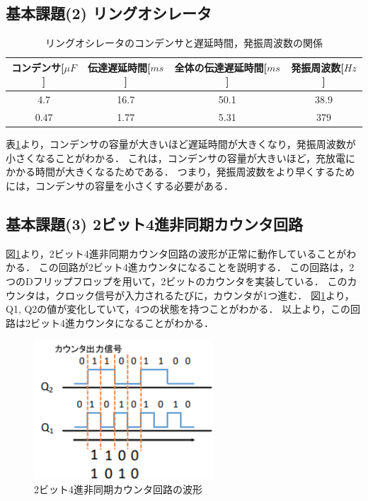 \documentclass{ltjsarticle}
\begin{document}
\subsection{基本課題(2) リングオシレータ}
\begin{table}[H]
\centering
\begin{tabular}{|c|c|c|c|}
\hline
コンデンサ[${\mu F}$] & 伝達遅延時間[${ms}$] & 全体の伝達遅延時間[${ms}$] & 発振周波数[${Hz}$] \\ \hline
4.7 & 16.7 & 50.1 & 38.9  \\ \hline
0.47 & 1.77 & 5.31 & 379 \\ \hline
\end{tabular}
\caption{リングオシレータのコンデンサと遅延時間，発振周波数の関係}
\label{tab:discussion_results}
\end{table}

表\ref{tab:discussion_results}より，コンデンサの容量が大きいほど遅延時間が大きくなり，発振周波数が小さくなることがわかる．
これは，コンデンサの容量が大きいほど，充放電にかかる時間が大きくなるためである．
つまり，発振周波数をより早くするためには，コンデンサの容量を小さくする必要がある．

\subsection{基本課題(3) 2ビット4進非同期カウンタ回路}
図\ref{fig:3_experiment_results}より，2ビット4進非同期カウンタ回路の波形が正常に動作していることがわかる．
この回路が2ビット4進カウンタになることを説明する．
この回路は，2つのDフリップフロップを用いて，2ビットのカウンタを実装している．
このカウンタは，クロック信号が入力されるたびに，カウンタが1つ進む．
図\ref{fig:3_experiment_results}より，Q1, Q2の値が変化していて，4つの状態を持つことがわかる．
以上より，この回路は2ビット4進カウンタになることがわかる．
\begin{figure}[H]
  \centering
  \includegraphics[width=0.6\textwidth]{figs/ringosilator.png}
  \caption{2ビット4進非同期カウンタ回路の波形}
  \label{fig:3_experiment_results}
\end{figure}
\end{document}

